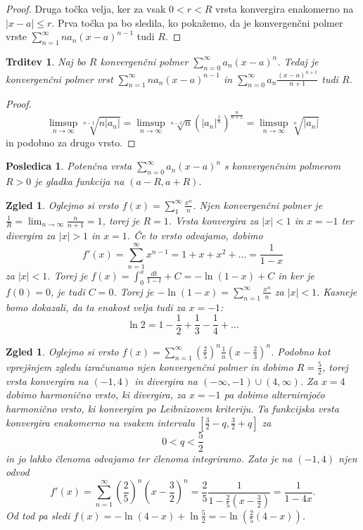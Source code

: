 \documentclass[10pt, a4paper]{article}
\newtheorem{posledica}[izr]{Posledica}
\newtheorem{trditev}[izr]{Trditev}
\newtheorem{zgled}[izr]{Zgled}
\newenvironment{noticeC}{%
  \tcolorbox[%
  notitle,
  empty,
  enhanced,  %
  breakable,
  coltext=black, 
  fontupper=\rmfamily,
  noparskip,
  sharp corners,
  boxrule=-1pt,  %
  frame hidden,
  left=7pt,  %
  right=7pt,
  top=5pt,
  bottom=5pt,
  before skip=2.5ex plus 2pt,
  after skip=2.5ex plus 2pt,
  overlay unbroken and last={%
  },
  ]}
{\endtcolorbox}
\newenvironment{dokaz}%
  {\begin{noticeC}\begin{proof}}%
  {\end{proof}\end{noticeC}}
\newcommand{\limzap}[1]{\lim_{n \to \infty} {#1}}
\begin{document}
\begin{dokaz}
    Druga točka velja, ker za vsak $0 < r < R$ vrsta konvergira enakomerno na $|x-a| \leq r.$
    Prva točka pa bo sledila, ko pokažemo, da je konvergenčni polmer vrste $\sum_{n=1} ^\infty n a_n (x-a)^{n-1}$ tudi $R$.
\end{dokaz}

\begin{trditev}
    Naj bo $R$ konvergenčni polmer $\sum_{n=0} ^\infty a_n (x-a)^n$.
    Tedaj je konvergenčni polmer vrst $\sum_{n=1} ^\infty n a_n (x-a)^{n-1}$ in 
    $\sum_{n=0} ^\infty a_n \frac{(x-a)^{n+1}}{n+1}$ tudi $R$.
\end{trditev}

\begin{dokaz}
    $$\limsup_{n \to \infty} \sqrt[n-1] {n |a_n|} = \limsup_{n \to \infty} \sqrt[n-1] {n} \left(|a_n|^{\frac{1}{n}}\right) ^{\frac{n}{n+1}} = \limsup_{n \to \infty} \sqrt[n]{|a_n|}$$
    in podobno za drugo vrsto.
\end{dokaz}

\begin{posledica}
    Potenčna vrsta $\sum_{n=0} ^\infty a_n (x-a)^n$ s konvergenčnim polmerom $R > 0$ je gladka funkcija na $(a - R, a+ R).$
\end{posledica}

\begin{zgled}
    Oglejmo si vrsto $f(x) = \sum_{1} ^\infty \frac{x^n}{n}$.
    Njen konvergenčni polmer je $\frac{1}{R} = \limzap{\frac{n}{n+1}} = 1$, torej je $R = 1$.
    Vrsta konvergira za $|x| < 1$ in $x = -1$ ter divergira za $|x| > 1$ in $x = 1$.
    Če to vrsto odvajamo, dobimo $$f'(x) = \sum_{n=1} ^\infty x^{n-1} = 1+ x+ x^2 + \dots = \frac{1}{1 - x}$$ za $|x| < 1$.
    Torej je $f(x) = \int_0 ^x \frac{dt}{1-t} + C = -\ln(1-x) + C$ in ker je $f(0) = 0$, je tudi $C = 0$.
    Torej je $- \ln(1-x) = \sum_{n=1} ^\infty \frac{x^n}{n}$ za $|x| < 1$.
    Kasneje bomo dokazali, da ta enakost velja tudi za $x = -1$:
    $$\ln 2 = 1 - \frac{1}{2} + \frac{1}{3} - \frac{1}{4} + \dots$$
\end{zgled}

\begin{zgled}
    Oglejmo si vrsto $f(x) = \sum_{n = 1} ^\infty \left(\frac{2}{5}\right)^n \frac{1}{n} \left(x - \frac{2}{3} \right)^n$.
    Podobno kot vprejšnjem zgledu izračunamo njen konvergenčni polmer in dobimo $R = \frac{5}{2}$,
    torej vrsta konvergira na $(-1, 4)$ in divergira na $(-\infty, -1) \cup (4, \infty)$.
    Za $x = 4$ dobimo harmonično vrsto, ki divergira, za $x = -1$ pa dobimo alternirajočo harmonično vrsto, ki konvergira po Leibnizovem kriteriju.
    Ta funkcijska vrsta konvergira enakomerno na vsakem intervalu $[\frac{3}{2} - q, \frac{3}{2} + q]$ za $$0 < q < \frac{5}{2}$$
    in jo lahko členoma odvajamo ter členoma integriramo.
    Zato je na $(-1, 4)$ njen odvod $$f'(x) = \sum_{n=1} ^\infty \left(\frac{2}{5}\right)^n \left(x - \frac{3}{2}\right)^n = \frac{2}{5} \frac{1}{1 - \frac{2}{5} (x - \frac{3}{2})} = \frac{1}{1-4x}.$$
    Od tod pa sledi $f(x) = -\ln(4-x) + \ln \frac{5}{2} = - \ln(\frac{2}{5} (4-x))$.
\end{zgled}
\end{document}
